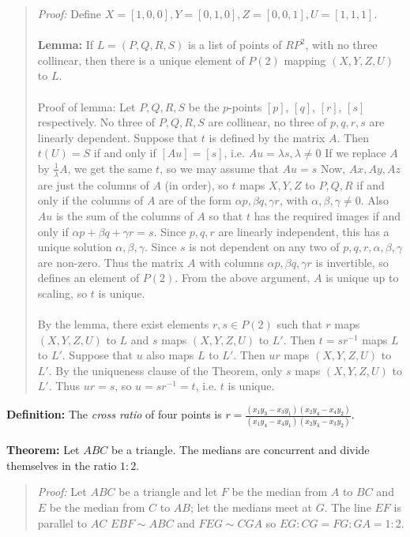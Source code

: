 \begin{quote}
\emph{Proof:}
Define $X = [1,0,0], Y = [0,1,0], Z = [0,0,1], U = [1,1,1]$.
\\
\\
{\bf Lemma:}
If $L =(P,Q,R,S)$ is a list of points of $RP^2$, with no three collinear, then 
there is a unique element of $P(2)$ mapping $(X,Y,Z,U)$ to $L$.
\\
\\
Proof of lemma: Let $P, Q, R, S$ be the $p$-points $[p]$, $[q]$, $[r]$, $[s]$ respectively.
No three of $P,Q,R,S$ are collinear, no three of $p,q,r,s$ are linearly dependent.
Suppose that $t$ is defined by the matrix $A$. 
Then $t(U) = S$ if and only if $[Au] = [s]$, i.e. $Au = \lambda s, \lambda \ne 0$ 
If we replace $A$ by ${\frac 1 {\lambda}}A$, we get the same $t$, so we may assume that $Au = s$
Now, $Ax, Ay, Az$ are just the columns of $A$ (in order), so
$t$ maps $X, Y, Z$ to $P, Q, R$ if and only if the columns of $A$ are 
of the form $\alpha p, \beta q, \gamma r$, with $\alpha, \beta, \gamma \ne 0$.
Also $Au$ is the sum of the columns of $A$ so that $t$ has the required images 
if and only if $\alpha p + \beta q + \gamma r = s$.
Since $p, q, r$ are linearly independent, this has a unique solution $\alpha, \beta, \gamma$.
Since $s$ is not dependent on any two of $p, q, r, \alpha, \beta, \gamma$  are non-zero.
Thus the matrix $A$ with columns $\alpha p, \beta q, \gamma r$ is invertible, so defines an element 
of $P(2)$. From the above argument, $A$ is unique up to scaling, so $t$ is unique.
\\
\\
By the lemma, there exist elements $r, s \in  P(2) $
such that $r$ maps $(X,Y,Z,U)$ to $L$ and $s$ maps $(X,Y,Z,U)$ to $L'$.
Then $t = sr^{-1}$ maps $L$ to $L'$.
Suppose that $u$ also maps $L$ to $L'$. Then $ur$ maps $(X,Y,Z,U)$ to $L'$.
By the uniqueness clause of the Theorem, only $s$ maps $(X,Y,Z,U)$ to $L'$.
Thus $ur = s$, so $u = sr^{-1} = t$, i.e. $t$ is unique.
\end{quote}
{\bf Definition:}
The \emph{cross ratio} of four points is
$r= {\frac {(x_{1}y_{3}-x_{3}y_{1}) (x_{2}y_{4}-x_{4}y_{2})}
{ (x_{1}y_{4}-x_{4}y_{1}) (x_{2}y_{3}-x_{3}y_{2})}}$.
\\
\\
{\bf Theorem:}  Let $ABC$ be a triangle.  The medians are concurrent and divide themselves in
the ratio $1:2$.
\begin{quote}
\emph{Proof:} Let $ABC$ be a triangle and let $F$ be the median from $A$ to $BC$ and
$E$ be the median from $C$ to $AB$; let the medians meet at $G$.
The line $EF$ is parallel to $AC$ $EBF \sim ABC$ and $FEG \sim CGA$ so
$EG:CG = FG : GA = 1:2$.
\end{quote}
